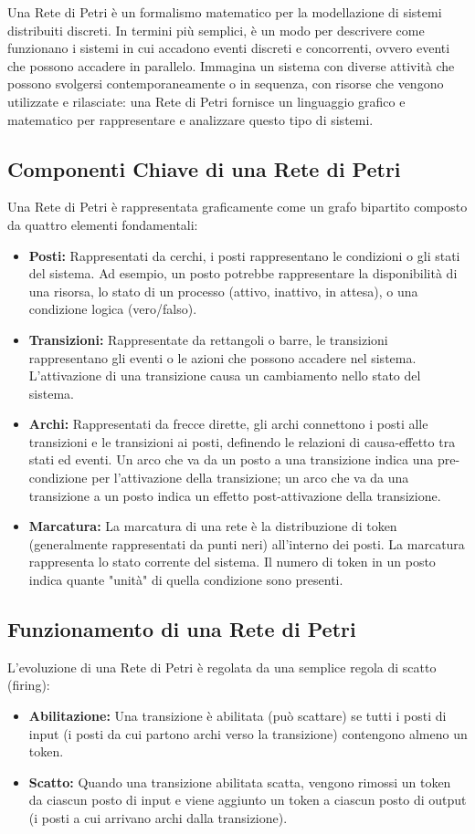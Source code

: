 Una Rete di Petri è un formalismo matematico per la modellazione di sistemi distribuiti discreti. In termini più semplici, è un modo per descrivere come funzionano i sistemi in cui accadono eventi discreti e concorrenti, ovvero eventi che possono accadere in parallelo. Immagina un sistema con diverse attività che possono svolgersi contemporaneamente o in sequenza, con risorse che vengono utilizzate e rilasciate: una Rete di Petri fornisce un linguaggio grafico e matematico per rappresentare e analizzare questo tipo di sistemi.

\subsection{Componenti Chiave di una Rete di Petri}
Una Rete di Petri è rappresentata graficamente come un grafo bipartito composto da quattro elementi fondamentali:
\begin{itemize}
    \item \textbf{Posti:} Rappresentati da cerchi, i posti rappresentano le condizioni o gli stati del sistema. Ad esempio, un posto potrebbe rappresentare la disponibilità di una risorsa, lo stato di un processo (attivo, inattivo, in attesa), o una condizione logica (vero/falso).
    \item \textbf{Transizioni:} Rappresentate da rettangoli o barre, le transizioni rappresentano gli eventi o le azioni che possono accadere nel sistema. L'attivazione di una transizione causa un cambiamento nello stato del sistema.
    \item \textbf{Archi:} Rappresentati da frecce dirette, gli archi connettono i posti alle transizioni e le transizioni ai posti, definendo le relazioni di causa-effetto tra stati ed eventi. Un arco che va da un posto a una transizione indica una pre-condizione per l'attivazione della transizione; un arco che va da una transizione a un posto indica un effetto post-attivazione della transizione.
    \item \textbf{Marcatura:} La marcatura di una rete è la distribuzione di token (generalmente rappresentati da punti neri) all'interno dei posti. La marcatura rappresenta lo stato corrente del sistema. Il numero di token in un posto indica quante "unità" di quella condizione sono presenti.
\end{itemize}

\subsection{Funzionamento di una Rete di Petri}
L'evoluzione di una Rete di Petri è regolata da una semplice regola di scatto (firing):
\begin{itemize}
    \item \textbf{Abilitazione:} Una transizione è abilitata (può scattare) se tutti i posti di input (i posti da cui partono archi verso la transizione) contengono almeno un token.
    \item \textbf{Scatto:} Quando una transizione abilitata scatta, vengono rimossi un token da ciascun posto di input e viene aggiunto un token a ciascun posto di output (i posti a cui arrivano archi dalla transizione).
\end{itemize}

